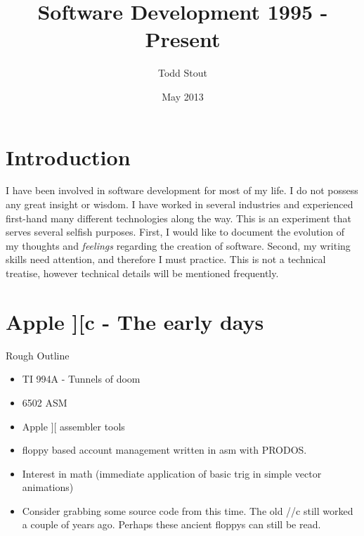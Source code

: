 \documentclass[12pt]{article}
\title{Software Development 1995 - Present}
\author{Todd Stout}
\date{May 2013}
\begin{document}
\maketitle

\section{Introduction}
I have been involved in software development for most of my life. I do not possess any great insight or wisdom. I have worked in several industries and experienced first-hand many different technologies along the way. 
This is an experiment that serves several selfish purposes. First, I would like to document the evolution of my thoughts and \emph{feelings} regarding the creation of software. Second, my writing skills need attention, and therefore I must practice. This is not a technical treatise, however technical details will be mentioned frequently.

\pagebreak

%
%
\section{Apple ][c - The early days}
	Rough Outline
	\begin{itemize}
	\item TI 994A - Tunnels of doom
	\item 6502 ASM
	\item Apple ][ assembler tools
	\item floppy based account management written in asm with PRODOS.
	\item Interest in math (immediate application of basic trig in simple vector animations)
	\item Consider grabbing some source code from this time. The old //c still worked a couple of years ago. Perhaps these ancient floppys can still be read.
	\end{itemize}
	
\end{document}
